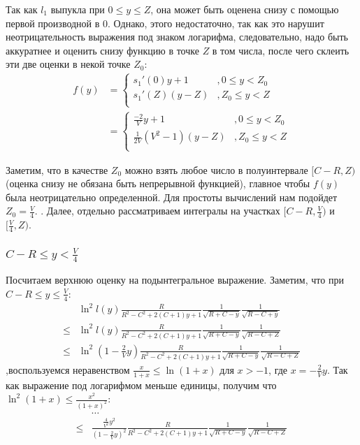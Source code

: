 Так как $l_1$ выпукла при $0 \le y \le Z$, она может быть оценена снизу с помощью первой производной в $0$. Однако, этого недостаточно, так как это нарушит неотрицательность выражения под знаком логарифма, следовательно, надо быть аккуратнее и оценить снизу функцию в точке $Z$ в том числа, после чего склеить эти две оценки в некой точке $Z_0$:
\begin{align*}
f(y)
& = 
\begin{cases}
s_1'(0) y + 1   &, 0 \le y < Z_0  \\
s_1'(Z) (y - Z) &, Z_0 \le y < Z \\
\end{cases}
\\
& =
\begin{cases}
\frac{-2}{V} y + 1   &, 0 \le y < Z_0  \\
\frac{1}{2 V}(V^2 - 1) (y - Z) &, Z_0 \le y < Z \\
\end{cases}
\end{align*}

Заметим, что в качестве $Z_0$ можно взять любое число в полуинтервале $[C-R, Z)$ (оценка снизу не обязана быть непрерывной функцией), главное чтобы $f(y)$ была неотрицательно определенной. Для простоты вычислений нам подойдет $Z_0 = \frac{V}{4}$. . Далее, отдельно рассматриваем интегралы на участках $[C - R, \frac{V}{4})$ и $[\frac{V}{4}, Z)$.

\subsubsection{$C - R \le y < \frac{V}{4}$}

Посчитаем верхнюю оценку на подынтегральное выражение. Заметим, что при $C - R \le y \le \frac{V}{4}$:
\begin{align*}
       & \ln^2 l(y) \frac{R}{R^2 - C^2 + 2 (C + 1) y + 1} \frac{1}{\sqrt{R + C - y}} \frac{1}{\sqrt{R - C + y}}
\\ \le & \ln^2 l(y) \frac{R}{R^2 - C^2 + 2 (C + 1) y + 1} \frac{1}{\sqrt{R + C - y}} \frac{1}{\sqrt{R - C + Z}}
\\ \le & \ln^2 (1 - \frac{2}{V} y) \frac{R}{R^2 - C^2 + 2 (C + 1) y + 1} \frac{1}{\sqrt{R + C - y}} \frac{1}{\sqrt{R - C + Z}}
\end{align*}
,воспользуемся неравенством $\frac{x}{1 + x} \le \ln (1 + x)$ для $x > -1$, где $x = -\frac{2}{V} y$. Так как выражение под логарифмом меньше единицы, получим что $\ln^2 (1 + x) \le \frac{x^2}{(1 + x)^2}$:
\begin{align*}
       & \dots 
\\ \le & \frac{\frac{4}{V^2}y^2}{(1 - \frac{2}{V}y)^2}  \frac{R}{R^2 - C^2 + 2 (C + 1) y + 1} \frac{1}{\sqrt{R + C - y}} \frac{1}{\sqrt{R - C + Z}}
\end{align*}


